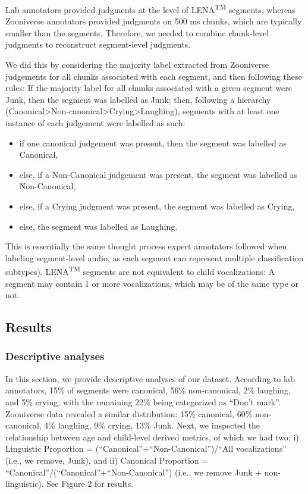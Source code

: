 \documentclass[english,,man,floatsintext]{apa6}
\providecommand{\tightlist}{%
  \setlength{\itemsep}{0pt}\setlength{\parskip}{0pt}}
\begin{document}
Lab annotators provided judgments at the level of LENA\textsuperscript{TM} segments, whereas Zooniverse annotators provided judgments on 500 ms chunks, which are typically smaller than the segments. Therefore, we needed to combine chunk-level judgments to reconstruct segment-level judgments.

We did this by considering the majority label extracted from Zooniverse judgements for all chunks associated with each segment, and then following these rules: If the majority label for all chunks associated with a given segment were Junk, then the segment was labelled as Junk; then, following a hierarchy (Canonical\textgreater{}Non-canonical\textgreater{}Crying\textgreater{}Laughing), segments with at least one instance of each judgement were labelled as such:

\begin{itemize}
\tightlist
\item
  if one canonical judgement was present, then the segment was labelled as Canonical,
\item
  else, if a Non-Canonical judgement was present, the segment was labelled as Non-Canonical,
\item
  else, if a Crying judgment was present, the segment was labelled as Crying,
\item
  else, the segment was labelled as Laughing.
\end{itemize}

This is essentially the same thought process expert annotators followed when labeling segment-level audio, as each segment can represent multiple classification subtypes). LENA\textsuperscript{TM} segments are not equivalent to child vocalizations: A segment may contain 1 or more vocalizations, which may be of the same type or not.

\hypertarget{results}{%
\subsection{Results}\label{results}}

\hypertarget{descriptive-analyses}{%
\subsubsection{Descriptive analyses}\label{descriptive-analyses}}

In this section, we provide descriptive analyses of our dataset. According to lab annotators, 15\% of segments were canonical, 56\% non-canonical, 2\% laughing, and 5\% crying, with the remaining 22\% being categorized as \enquote{Don't mark}. Zooniverse data revealed a similar distribution: 15\% canonical, 60\% non-canonical, 4\% laughing, 9\% crying, 13\% Junk.
Next, we inspected the relationship between age and child-level derived metrics, of which we had two: i) Linguistic Proportion = (\enquote{Canonical}+\enquote{Non-Canonical})/\enquote{All vocalizations} (i.e., we remove, Junk), and ii) Canonical Proportion = \enquote{Canonical}/(\enquote{Canonical}+\enquote{Non-Canonical}) (i.e., we remove Junk + non-linguistic). See Figure 2 for results.
\end{document}
